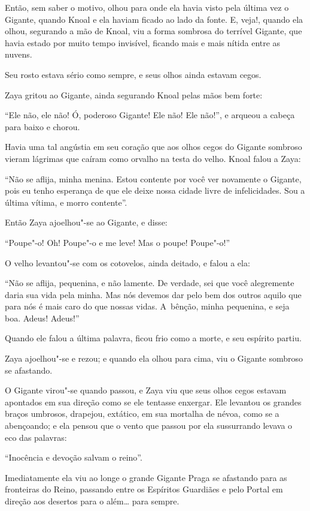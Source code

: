 Então, sem saber o motivo, olhou para onde ela havia visto pela última
vez o Gigante, quando Knoal e ela haviam ficado ao lado da fonte. E,
veja!, quando ela olhou, segurando a mão de Knoal, viu a forma sombrosa
do terrível Gigante, que havia estado por muito tempo invisível, ficando
mais e mais nítida entre as nuvens.

Seu rosto estava sério como sempre, e seus olhos ainda estavam cegos.

Zaya gritou ao Gigante, ainda segurando Knoal pelas mãos bem forte:

``Ele não, ele não! Ó, poderoso Gigante! Ele não! Ele não!'', e arqueou
a cabeça para baixo e chorou.

Havia uma tal angústia em seu coração que aos olhos cegos do Gigante
sombroso vieram lágrimas que caíram como orvalho na testa do velho.
Knoal falou a Zaya:

``Não se aflija, minha menina. Estou contente por você ver novamente o
Gigante, pois eu tenho esperança de que ele deixe nossa cidade livre de
infelicidades. Sou a última vítima, e morro contente''.

Então Zaya ajoelhou"-se ao Gigante, e disse:

``Poupe"-o! Oh! Poupe"-o e me leve! Mas o poupe! Poupe"-o!''

O velho levantou"-se com os cotovelos, ainda deitado, e falou a ela:

``Não se aflija, pequenina, e não lamente. De verdade, sei que você
alegremente daria sua vida pela minha. Mas nós devemos dar pelo bem dos
outros aquilo que para nós é mais caro do que nossas vidas. A~bênção,
minha pequenina, e seja boa. Adeus! Adeus!''

Quando ele falou a última palavra, ficou frio como a morte, e seu
espírito partiu.

Zaya ajoelhou"-se e rezou; e quando ela olhou para cima, viu o Gigante
sombroso se afastando.

O Gigante virou"-se quando passou, e Zaya viu que seus olhos cegos estavam
apontados em sua direção como se ele tentasse enxergar. Ele levantou os
grandes braços umbrosos, drapejou, extático, em sua mortalha de névoa,
como se a abençoando; e ela pensou que o vento que passou por ela
sussurrando levava o eco das palavras:

``Inocência e devoção salvam o reino''.

Imediatamente ela viu ao longe o grande Gigante Praga se afastando para
as fronteiras do Reino, passando entre os Espíritos Guardiães e pelo
Portal em direção aos desertos para o além… para sempre.
